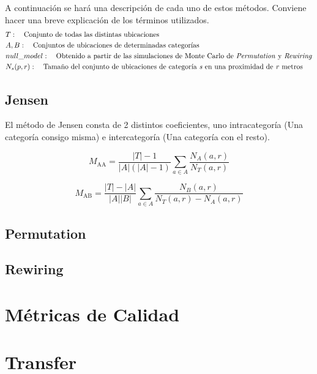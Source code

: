 A continuación se hará una descripción de cada uno de estos métodos. Conviene hacer una
breve explicación de los términos utilizados.
\begin{align*}
	& T: \quad \text{Conjunto de todas las distintas ubicaciones} \\
	& A,B: \quad \text{Conjuntos de ubicaciones de determinadas categorías}\\
	& null\_model: \quad \text{Obtenido a partir de las simulaciones de Monte Carlo de \textit{Permutation} y  
		\textit{Rewiring}} \\
	& N_s(p,r): \quad \text{Tamaño del conjunto de ubicaciones de categoría \textit{s} en una proximidad de \textit{r} metros }
\end{align*}

\subsection{Jensen}
El método de Jensen consta de 2 distintos coeficientes, uno intracategoría (Una categoría consigo misma) e intercategoría (Una categoría con el resto).

\begin{equation*}
	M_\text{AA} = \frac{|T| - 1}{|A|(|A|-1)} \sum_{a \in A}\frac{N_A(a,r)}{N_T(a,r)}
\end{equation*}

\begin{equation*}
	M_\text{AB} = \frac{|T| - |A|}{|A||B|} \sum_{a \in A}\frac{N_B(a,r)}{N_T(a,r) - N_A(a,r)}
\end{equation*}

\subsection{Permutation}

\subsection{Rewiring}

\section{Métricas de Calidad}

\section{Transfer}

